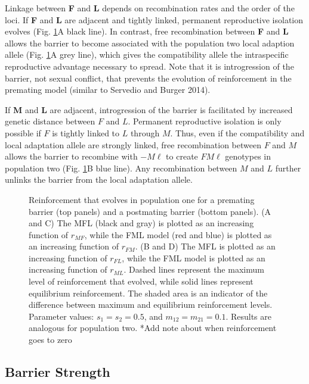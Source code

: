 \documentclass[11pt]{article}
\begin{document}
Linkage between \textbf{F} and \textbf{L} depends on recombination rates and the order of the loci. If \textbf{F} and \textbf{L} are adjacent and tightly linked, permanent reproductive isolation evolves (Fig. \ref{fig:recombination}A black line). In contrast, free recombination between \textbf{F} and \textbf{L} allows the barrier to become associated with the population two local adaption allele (Fig. \ref{fig:recombination}A grey line), which gives the compatibility allele the intraspecific reproductive advantage necessary to spread. Note that it is introgression of the barrier, not sexual conflict, that prevents the evolution of reinforcement in the premating model (similar to Servedio and Burger 2014).  

If \textbf{M} and \textbf{L} are adjacent, introgression of the barrier is facilitated by increased genetic distance between $F$ and $L$. Permanent reproductive isolation is only possible if $F$ is tightly linked to $L$ through $M$. Thus, even if the compatibility and local adaptation allele are strongly linked, free recombination between $F$ and $M$ allows the barrier to recombine with $-M\ell$ to create $FM\ell$ genotypes in population two (Fig. \ref{fig:recombination}B blue line). Any recombination between $M$ and $L$ further unlinks the barrier from the local adaptation allele.




\begin{figure}
[!htb]
\centering
{}
\caption{
\linespread{1.618}\selectfont
Reinforcement that evolves in population one for a premating barrier (top panels) and a postmating barrier (bottom panels).  (A and C) The MFL (black and gray) is plotted as an increasing function of $r_{MF}$, while the FML model (red and blue) is plotted as an increasing function of $r_{FM}$.  (B and D) The MFL is plotted as an increasing function of $r_{FL}$, while the FML model is plotted as an increasing function of $r_{ML}$. Dashed lines represent the maximum level of reinforcement that evolved, while solid lines represent equilibrium reinforcement.  The shaded area is an indicator of the difference between maximum and equilibrium reinforcement levels. Parameter values: $s_{1} = s_{2} = 0.5$, and $m_{12} = m_{21} = 0.1$. Results are analogous for population two. *Add note about when reinforcement goes to zero
}
\label{fig:recombination}
\end{figure}


\FloatBarrier


\subsection*{Barrier Strength}
\end{document}
